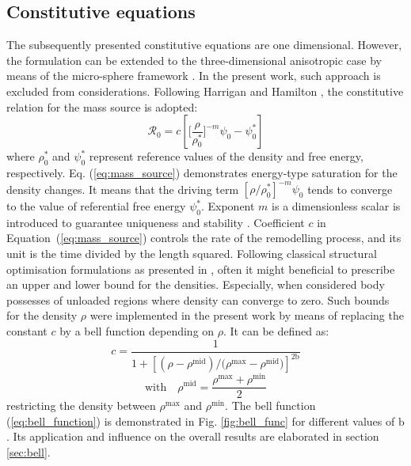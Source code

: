 \documentclass[11pt]{ACMEarticle}
\numberwithin{equation}{section}
\begin{document}
\subsection{Constitutive equations}
The subsequently presented constitutive equations are one dimensional. However, the formulation can be extended to the three-dimensional anisotropic case by means of the micro-sphere framework \citep{Waffenschmidt2012}. In the present work, such approach is excluded from considerations.
Following Harrigan and Hamilton \citep{Harrigan1993}, the constitutive relation for the mass source is adopted:
\begin{equation}
\mathcal{R}_{0}=c\left[\Biggl[\frac{\rho}{\rho_{0}^{\ast}}\Biggr]^{-m}\psi_{0}-\psi_{0}^{\ast}\right]
\label{eq:mass_source}
\end{equation}
where $\rho_0^\ast$ and $\psi_{0}^\ast$ represent reference values of the density and free energy, respectively.  Eq. (\ref{eq:mass_source}) demonstrates energy-type saturation for the density changes. It means that the driving term $\left[ \rho / \rho_0^\ast \right]^{-m}\psi_0$ tends to converge to the value of referential free energy $\psi_{0}^\ast$. 
Exponent $m$ is a dimensionless scalar is introduced to guarantee uniqueness and stability \citep{Harrigan1993} . 
Coefficient $c$ in Equation~(\ref{eq:mass_source}) controls the rate of the remodelling process, and its unit is the time divided by the length squared. Following classical structural optimisation formulations as presented in \citep{Waffenschmidt2012}, often it might beneficial to prescribe an upper and lower bound for the densities. Especially, when considered body possesses of unloaded regions where density can converge to zero. Such bounds for the density $\rho$ were implemented in the present work by means of replacing the constant $c$ by a bell function depending on $\rho$. It can be defined as:
\begin{equation*}
c=\frac{1}{1 + \left[  (\rho - \rho^{\mathrm{mid}}) / (\rho{^\mathrm{max}} - \rho{^\mathrm{mid})} \right]^{2\mathrm b}}
\end{equation*}
\begin{equation}
\mathrm{with} \quad \rho^{\mathrm{mid}} = \frac{\rho{^\mathrm{max}} + \rho{^\mathrm{min}}}{2}
\label{eq:bell_function}
\end{equation}
restricting the density between $ \rho{^\mathrm{max}}$ and $ \rho{^\mathrm{min}}$. The bell function (\ref{eq:bell_function}) is demonstrated in Fig. \ref{fig:bell_func} for different values of $\mathrm{b}$. Its application and influence on the overall results are elaborated in section \ref{sec:bell}.
\end{document}
